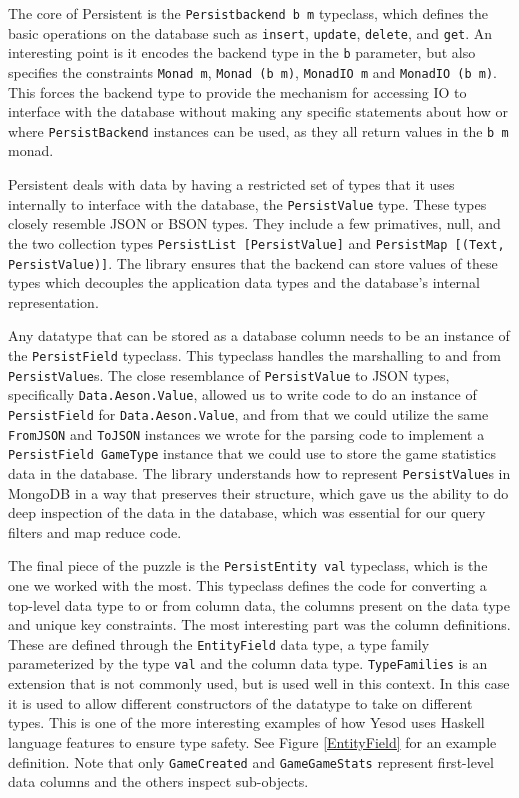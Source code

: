 \documentclass[letterpaper,twocolumn,9pt]{article}
\newcommand{\code}[1]{\texttt{#1}}
\begin{document}
The core of Persistent is the \code{Persistbackend b m} typeclass, which defines the basic operations on the database such as \code{insert}, \code{update}, \code{delete}, and \code{get}.  An interesting point is it encodes the backend type in the \code{b} parameter, but also specifies the constraints \code{Monad m}, \code{Monad (b m)}, \code{MonadIO m} and \code{MonadIO (b m)}.  This forces the backend type to provide the mechanism for accessing IO to interface with the database without making any specific statements about how or where \code{PersistBackend} instances can be used, as they all return values in the \code{b m} monad.

Persistent deals with data by having a restricted set of types that it uses internally to interface with the database, the \code{PersistValue} type.  These types closely resemble JSON or BSON types.  They include a few primatives, null, and the two collection types \code{PersistList [PersistValue]} and \code{PersistMap [(Text, PersistValue)]}.  The library ensures that the backend can store values of these types which decouples the application data types and the database's internal representation.

Any datatype that can be stored as a database column needs to be an instance of the \code{PersistField} typeclass.  This typeclass handles the marshalling to and from \code{PersistValue}s.  The close resemblance of \code{PersistValue} to JSON types, specifically \code{Data.Aeson.Value}, allowed us to write code to do an instance of \code{PersistField} for \code{Data.Aeson.Value}, and from that we could utilize the same \code{FromJSON} and \code{ToJSON} instances we wrote for the parsing code to implement a \code{PersistField GameType} instance that we could use to store the game statistics data in the database.  The library understands how to represent \code{PersistValue}s in MongoDB in a way that preserves their structure, which gave us the ability to do deep inspection of the data in the database, which was essential for our query filters and map reduce code.

The final piece of the puzzle is the \code{PersistEntity val} typeclass, which is the one we worked with the most.  This typeclass defines the code for converting a top-level data type to or from column data, the columns present on the data type and unique key constraints.  The most interesting part was the column definitions. These are defined through the \code{EntityField} data type, a type family parameterized by the type \code{val} and the column data type.  \code{TypeFamilies} is an extension that is not commonly used, but is used well in this context.  In this case it is used to allow different constructors of the datatype to take on different types.  This is one of the more interesting examples of how Yesod uses Haskell language features to ensure type safety.  See Figure \ref{EntityField} for an example definition. Note that only \code{GameCreated} and \code{GameGameStats} represent first-level data columns and the others inspect sub-objects.
\end{document}
